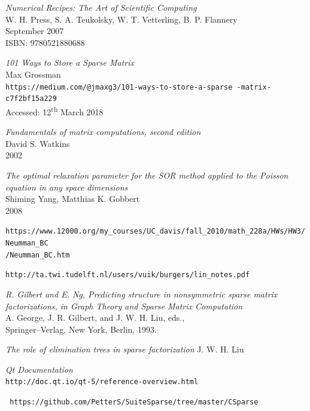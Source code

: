 \documentclass[a4paper]{article}
\begin{document}
\begin{thebibliography}{15}

		\emph{Numerical Recipes: The Art of Scientific Computing}\\
		W. H. Press, S. A. Teukolsky, W. T. Vetterling, B. P. Flannery\\
		September 2007\\
		ISBN: 9780521880688

		\emph{101 Ways to Store a Sparse Matrix}\\
		Max Grossman\\
		\texttt{https://medium.com/@jmaxg3/101-ways-to-store-a-sparse
		-matrix-c7f2bf15a229}\\
		Accessed: 12\textsuperscript{th} March 2018
        
		\emph{Fundamentals of matrix computations,  second edition}\\
		David S. Watkins\\
		2002

		\emph{The optimal relaxation parameter for the SOR method
		applied to the Poisson equation in any space dimensions}\\
		Shiming Yang, Matthias K. Gobbert\\
		2008

	\texttt{https://www.12000.org/my\_courses/UC\_davis/fall\_2010/math\_228a/HWs/HW3/Neumman\_BC\\
	/Neumman\_BC.htm}
            
  		\verb!http://ta.twi.tudelft.nl/users/vuik/burgers/lin_notes.pdf!
  
		\emph{R. Gilbert and E. Ng, Predicting structure in 
		nonsymmetric sparse matrix factorizations,
		in Graph Theory and Sparse Matrix Computation}\\
		A. George, J. R. Gilbert, and J. W. H. Liu, eds.,\\
		Springer–Verlag, New York, Berlin, 1993.
    
		\emph{The role of elimination trees in sparse factorization}
		J. W. H. Liu

		\emph{Qt Documentation}\\
		\texttt{http://doc.qt.io/qt-5/reference-overview.html}

		\texttt{
		https://github.com/PetterS/SuiteSparse/tree/master/CSparse 
		}
\end{thebibliography}
\end{document}
